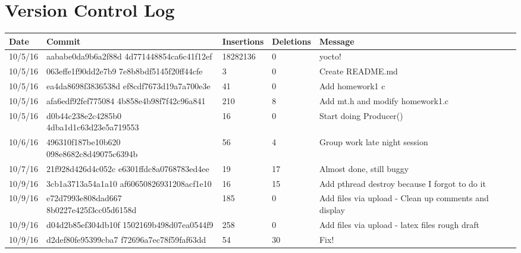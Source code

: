 \documentclass[letterpaper,10pt,draftclsnofoot,titlepage,onecolumn]{IEEEtran}
\begin{document}
	\section{Version Control Log}
	
\begin{center}

 \begin{tabular}{| m{2cm} | m{5cm} | m{2cm} | m{2cm} | m{3cm} | } 
\hline
 Date & Commit & Insertions & Deletions & Message \\ [0.5ex] 
 \hline\hline
  10/5/16 & aababe0da9b6a2f88d 4d771448854ca6c41f12ef & 18282136 & 0 & yocto! \\
 \hline
  10/5/16 & 063effe1f90dd2e7b9 7e8b8bdf5145f20ff44cfe & 3 & 0 & Create README.md \\
 \hline
  10/5/16 & ea4da8698f3836538d ef8cdf7673d19a7a700e3e & 41 & 0 & Add homework1 c \\
 \hline
  10/5/16 & afa6edf92fef775084 4b858e4b98f7f42c96a841 & 210 & 8 & Add mt.h and modify homework1.c \\
 \hline
  10/5/16 & d0b44c238e2c4285b0 4dba1d1c63d23e5a719553 & 16 & 0 & Start doing Producer() \\
 \hline
  10/6/16 & 496310f187be10b620 098e8682c8d49075c6394b & 56 & 4 & Group work late night session \\
 \hline
   10/7/16 & 21f928d426d4c052c e6301ffdc8a0768783ed4ee & 19 & 17 & Almost done, still buggy \\
 \hline
   10/9/16 & 3cb1a3713a54a1a10 af60650826931208acf1e10 & 16 & 15 & Add pthread destroy because I forgot to do it \\
 \hline
   10/9/16 & e72d7993e808dad667 8b0227e425f3cc05d6158d & 185 & 0 & Add files via upload - Clean up comments and display\\
 \hline
   10/9/16 & d04d2b85ef304db10f 1502169b498d07ea0544f9 & 258 & 0 & Add files via upload - latex files rough draft\\
 \hline
   10/9/16 & d2def80fe95399cba7 f72696a7ec78f59faf63dd & 54 & 30 & Fix!\\
 \hline
 
\end{tabular}
\end{center}
	
\clearpage
\end{document}
